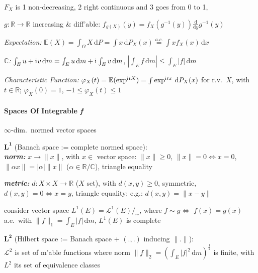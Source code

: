 \documentclass[8pt,twoside]{extarticle}
\newcommand{\compi}{\mathrm{i}\mkern1mu}
\begin{document}
\begin{multicols}{2}
$F_X$ is 1 non-decreasing, 2 right continuous and 3 goes from 0 to 1,



$g:\mathbb{R}\to\mathbb{R}$ increasing  \& diff'able: $f_{g(X)}(y){=}f_X(g^{-1}(y))\frac{\mathrm{d}}{\mathrm{d}y}g^{-1}(y)$

\textit{Expectation:} $\mathbb{E}(X)=\int_{\Omega}X\,\mathrm{d}P
=\int x\,\mathrm{d}P_X(x)
\overset{a.c.}{=}\int xf_X(x)\,\mathrm{d}x$

\textit{$\mathbb{C}$:} $\int_E u+\compi v \,\mathrm{d}m = \int_E u \,\mathrm{d}m  + \compi \int_E v \,\mathrm{d}m $, $|\int_E f \,\mathrm{d}m| \leq \int_E |f| \,\mathrm{d}m$

\textit{Characteristic Function:} $\varphi_X(t)=\mathbb{E}(\exp^{\compi tX}) = \int \exp^{\compi tx} \, \mathrm{d}P_X(x)$ for r.v.\ $X$, with $t\in \mathbb{R}$;
$\varphi_X(0)=1$, $-1\leq\varphi_X(t)\leq 1$


\paragraph{Spaces Of Integrable \textit{f}} $\infty$-dim.\ normed vector spaces 





\textbf{$\boldsymbol{L^1}$} (Banach space := complete normed space): \\ 

\textbf{\textit{norm:}} $x\to \|x\|$, with $x\in$ vector space: $\| x\|\geq 0$, $\| x\|=0 \Leftrightarrow x=0$, $\|\alpha x\| =|\alpha| \| x\|$ ($\alpha\in\mathbb{R}/\mathbb{C}$), triangle equality

\textbf{\textit{metric:}}  $d:X\times X \to \mathbb{R}$ ($X$ set), with $d(x,y)\geq 0$, symmetric, $d(x,y){=}0 \Leftrightarrow x{=}y$, triangle equality; e.g.: $d(x,y)=\|x{-}y\|$

consider vector space $L^1(E) = \mathcal{L}^1(E)/_\sim$, where $f\sim g \Leftrightarrow $ $ f(x)=g(x)$ a.e.\ with $\|f\|_1=\int_E|f|\,\mathrm{d}m$, $L^1(E)$ is complete

\textbf{$\boldsymbol{L^2}$ }(Hilbert space := Banach space + $(.,.)$ inducing $\|.\|$): \\ $\mathcal{L}^2$ is set of m'able functions where norm $\|f\|_2=\left(\int_E|f|^2\,\mathrm{d}m\right)^{\frac{1}{2}}$ is finite, with $L^2$ its set of equivalence classes


\end{multicols}
\end{document}

